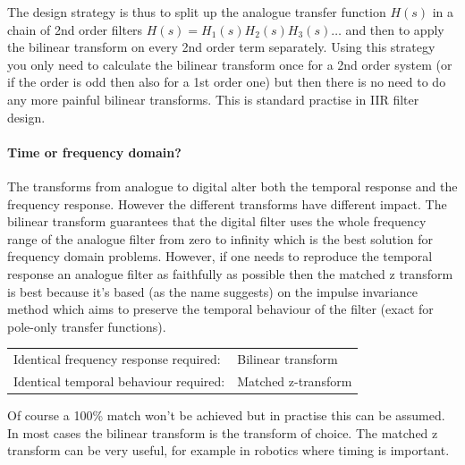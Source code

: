 \documentclass[12pt,a4paper]{article}
\begin{document}
The design strategy is thus to split up the analogue transfer function
$H(s)$ in a chain of 2nd order filters $H(s) = H_1(s) H_2(s) H_3(s)
\ldots$ and then to apply the bilinear transform on every 2nd order
term separately. Using this strategy you only need to calculate the bilinear
transform once for a 2nd order system (or if the order is odd then
also for a 1st order one) but then there is no need to do any more
painful bilinear transforms. This is standard practise in IIR filter
design.

\paragraph{Time or frequency domain?}
The transforms from analogue to digital alter both the temporal
response and the frequency response. However the different transforms
have different impact. The bilinear transform guarantees that the
digital filter uses the whole frequency range of the analogue filter
from zero to infinity which is the best solution for frequency domain
problems. However, if one needs to reproduce the temporal response an
analogue filter as faithfully as possible then the matched z transform
is best because it's based (as the name suggests) on the impulse
invariance method which aims to preserve the temporal behaviour of the
filter (exact for pole-only transfer functions).

\begin{center}
\begin{tabular}{ll}
  Identical frequency response required: & Bilinear transform \\
  Identical temporal behaviour required: & Matched z-transform \\
\end{tabular}
\end{center}

Of course a 100\% match won't be achieved but in practise this
can be assumed. In most cases the bilinear transform is the
transform of choice. The matched z transform can be very useful,
for example in robotics where timing is important.
\end{document}
